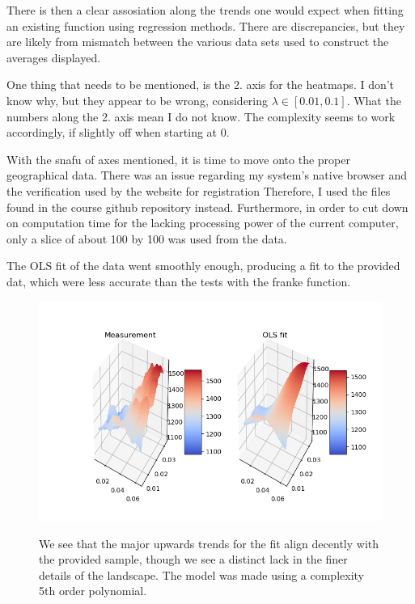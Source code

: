 \documentclass[ 12pt, a4paper ]{article}
\begin{document}
There is then a clear assosiation along the trends one would expect when fitting an existing 
function using regression methods. There are discrepancies, but they are likely from mismatch
between the various data sets used to construct the averages displayed. 

One thing that needs to be mentioned, is the 2. axis for the heatmaps. I don't know why, but they
appear to be wrong, considering $\lambda \in [0.01, 0.1]$. What the numbers along the 2. axis 
mean I do not know. The complexity seems to work accordingly, if slightly off when starting at 0.


With the snafu of axes mentioned, it is time to move onto the proper geographical data. There was
an issue regarding my system's native browser and the verification used by the website for 
registration Therefore, I used the files found in the course github repository instead. 
Furthermore, in order to cut down on computation time for the lacking processing power of the 
current computer, only a slice of about 100 by 100 was used from the data. 

The OLS fit of the data went smoothly enough, producing a fit to the provided dat, which were 
less accurate than the tests with the franke function. 

\begin{figure}[H]
\includegraphics[scale=0.7]{nordatasurface.png}
\label{fig:nordatasurface}
\caption{
    We see that the major upwards trends for the fit align decently with the provided sample, 
    though we see a distinct lack in the finer details of the landscape. The model was made using 
    a complexity 5th order polynomial.
}
\end{figure}
\end{document}
